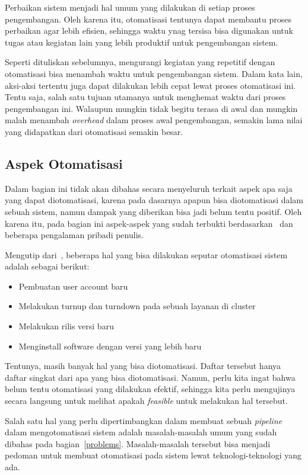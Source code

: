 Perbaikan sistem menjadi hal umum yang dilakukan di setiap proses pengembangan. Oleh karena itu, otomatisasi tentunya dapat membantu proses perbaikan agar lebih efisien, sehingga waktu ynag tersisa bisa digunakan untuk tugas atau kegiatan lain yang lebih produktif untuk pengembangan sistem.

Seperti dituliskan sebelumnya, mengurangi kegiatan yang repetitif dengan otomatisasi bisa menambah waktu untuk pengembangan sistem. Dalam kata lain, aksi-aksi tertentu juga dapat dilakukan lebih cepat lewat proses otomatisasi ini. Tentu saja, salah satu tujuan utamanya untuk menghemat waktu dari proses pengembangan ini. Walaupun mungkin tidak begitu terasa di awal dan mungkin malah menambah \textit{overhead} dalam proses awal pengembangan, semakin lama nilai yang didapatkan dari otomatisasi semakin besar.

\subsection{Aspek Otomatisasi}
Dalam bagian ini tidak akan dibahas secara menyeluruh terkait aspek apa saja yang dapat diotomatisasi, karena pada dasarnya apapun bisa diotomatisasi dalam sebuah sistem, namun dampak yang diberikan bisa jadi belum tentu positif. Oleh karena itu, pada bagian ini aspek-aspek yang sudah terbukti berdasarkan~\cite{beyer2016site} dan beberapa pengalaman pribadi penulis.

Mengutip dari~\cite{beyer2016site}, beberapa hal yang bisa dilakukan seputar otomatisasi sistem adalah sebagai berikut:
\begin{itemize}
  \item Pembuatan user account baru
  \item Melakukan turnup dan turndown pada sebuah layanan di cluster
  \item Melakukan rilis versi baru
  \item Menginstall software dengan versi yang lebih baru
\end{itemize}

Tentunya, masih banyak hal yang bisa diotomatisasi. Daftar tersebut hanya daftar singkat dari apa yang bisa diotomatisasi. Namun, perlu kita ingat bahwa belum tentu otomatisasi yang dilakukan efektif, sehingga kita perlu mengujinya secara langsung untuk melihat apakah \textit{feasible} untuk melakukan hal tersebut.

Salah satu hal yang perlu dipertimbangkan dalam membuat sebuah \textit{pipeline} dalam mengotomatisasi sistem adalah masalah-masalah umum yang sudah dibahas pada bagian~\ref{problems}. Masalah-masalah tersebut bisa menjadi pedoman untuk membuat otomatisasi pada sistem lewat teknologi-teknologi yang ada.

